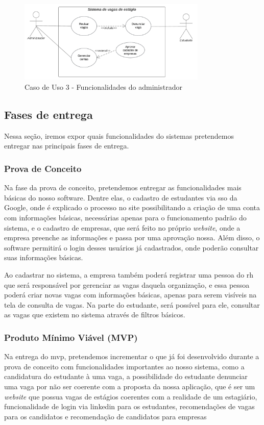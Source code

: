 \begin{figure}[H]
	\centering 
	\caption{\label{fig:caso3}Caso de Uso 3 - Funcionalidades do administrador}
	\includegraphics[width=0.8\textwidth]{imagens/caso-de-uso-3.png} 
\end{figure}

\subsection{Fases de entrega}

Nessa seção, iremos expor quais funcionalidades do sistemas pretendemos entregar nas principais fases de entrega.

\subsubsection{Prova de Conceito}

Na fase da prova de conceito, pretendemos entregar as funcionalidades mais básicas do nosso software. Dentre elas, o cadastro de estudantes via \ac{sso} da Google, onde é explicado o processo no site possibilitando a criação de uma conta com informações básicas, necessárias apenas para o funcionamento padrão do sistema, e o cadastro de empresas, que será feito no próprio \emph{website}, onde a empresa preenche as informações e passa por uma aprovação nossa. Além disso, o software permitirá o login desses usuários já cadastrados, onde poderão consultar suas informações básicas.

Ao cadastrar no sistema, a empresa também poderá registrar uma pessoa do \ac{rh} que será responsável por gerenciar as vagas daquela organização, e essa pessoa poderá criar novas vagas com informações básicas, apenas para serem visíveis na tela de consulta de vagas.
Na parte do estudante, será possível para ele, consultar as vagas que existem no sistema através de filtros básicos.

\subsubsection{Produto Mínimo Viável (MVP)}

Na entrega do \ac{mvp}, pretendemos incrementar o que já foi desenvolvido durante a prova de conceito com funcionalidades importantes ao nosso sistema, como a candidatura do estudante à uma vaga, a possibilidade do estudante denunciar uma vaga por não ser coerente com a proposta da nossa aplicação, que é ser um \emph{website} que possua vagas de estágios coerentes com a realidade de um estagiário, funcionalidade de login via \gls{linkedin} para os estudantes, recomendações de vagas para os candidatos e recomendação de candidatos para empresas
